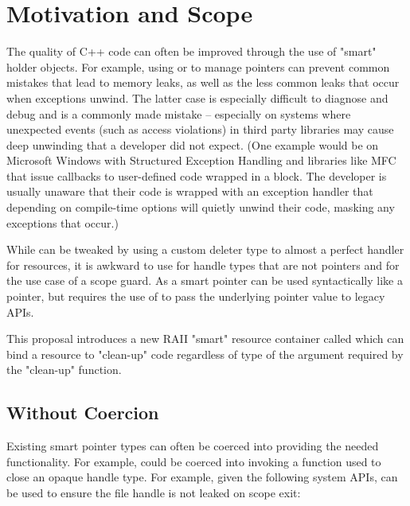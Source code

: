 \documentclass[ebook,11pt,article]{memoir}
\begin{document}
\chapter{Motivation and Scope}
The quality of C++ code can often be improved through the use of "smart" holder objects.  For example, using  or  to manage pointers can prevent common mistakes that lead to memory leaks, as well as the less common leaks that occur when exceptions unwind.  The latter case is especially difficult to diagnose and debug and is a commonly made mistake -- especially on systems where unexpected events (such as access violations) in third party libraries may cause deep unwinding that a developer did not expect.  (One example would be on Microsoft Windows with Structured Exception Handling and libraries like MFC that issue callbacks to user-defined code wrapped in a  block.  The developer is usually unaware that their code is wrapped with an exception handler that depending on compile-time options will quietly unwind their code, masking any exceptions that occur.)

While  can be tweaked by using a custom deleter type to almost a perfect handler for resources, it is awkward to use for handle types that are not pointers and for the use case of a scope guard. As a smart pointer   can be used syntactically like a pointer, but requires the use of  to pass the underlying pointer value to legacy APIs.

This proposal introduces a new RAII "smart" resource container called  which can bind a resource to "clean-up" code regardless of type of the argument required by the "clean-up" function.

\section {Without Coercion}
Existing smart pointer types can often be coerced into providing the needed functionality.  For example,  could be coerced into invoking a function used to close an opaque handle type.  For example, given the following system APIs,  can be used to ensure the file handle is not leaked on scope exit:
\end{document}
